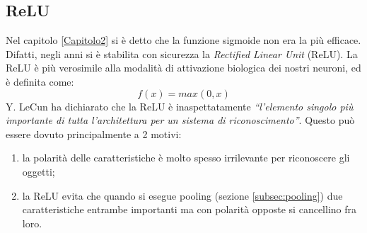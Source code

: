 \subsection{ReLU}
Nel capitolo \ref{Capitolo2} si è detto che la funzione sigmoide non era la più efficace. Difatti, negli anni si è stabilita con sicurezza la \emph{Rectified Linear Unit} (ReLU). La ReLU è più verosimile alla modalità di attivazione biologica dei nostri neuroni\parencite{Relu}, ed è definita come: 
$$
f(x) = max(0,x)
$$ 
Y. LeCun ha dichiarato che la ReLU è inaspettatamente \emph{“l'elemento
singolo più importante di tutta l'architettura per un sistema di riconoscimento”}. Questo può essere dovuto principalmente a 2 motivi:
\begin{enumerate}
\item la polarità delle caratteristiche è molto spesso irrilevante per riconoscere gli oggetti;
\item la ReLU evita che quando si esegue pooling (sezione \ref{subsec:pooling}) due caratteristiche entrambe importanti ma con polarità opposte si cancellino fra loro.
\end{enumerate}


